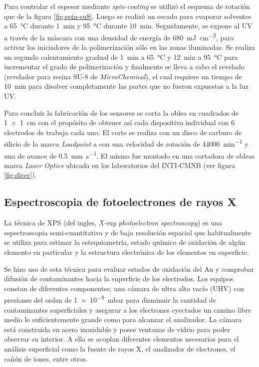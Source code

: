 		Para controlar el espesor mediante \textit{spin-coating} se utilizó el esquema de rotación que de la figura \ref{fig:spin-su8}. Luego se realizó un secado para evaporar solventes a \SI{65}{\celsius} durante \SI{1}{\minute} y \SI{95}{\celsius} durante \SI{10}{\minute}. Seguidamente, se expone al UV a través de la máscara con una densidad de energía de \SI{680}{mJ.cm^{-2}}, para activar los iniciadores de la polimerización sólo en las zonas iluminadas. Se realiza un segundo calentamiento gradual de \SI{1}{\minute} a \SI{65}{\celsius} y \SI{12}{\minute} a \SI{95}{\celsius} para incrementar el grado de polimerización y finalmente se lleva a cabo el revelado (revelador para resina SU-8 de \textit{MicroChemical}), el cual requiere un tiempo de \SI{10}{\minute} para disolver completamente las partes que no fueron expuestas a la luz UV. 
		
		Para concluir la fabricación de los sensores se corta la oblea en cuadrados de \SI{1x1}{\cm} con el propósito de obtener así cada dispositivo individual con 6 electrodos de trabajo cada uno. El corte se realiza con un disco de carburo de silicio de la marca \textit{Loadpoint} a con una velocidad de rotación de \SI{44000}{\minute^{-1}} y una de avance de \SI{0.5}{\mm\per\second}. El mismo fue montado en una cortadora de obleas marca \textit{Laser Optics} ubicada en los laboratorios del INTI-CMNB (ver figura \ref{fig:dicer}).
	
	\subsection{Espectroscopia de fotoelectrones de rayos X}

		La técnica de XPS (del ingles, \textit {X-ray photoelectron spectroscopy}) es una espectroscopia semi-cuantitativa y de baja resolución espacial que habitualmente se utiliza para estimar la estequiometría, estado químico de oxidación de algún elemento en particular y la estructura electrónica de los elementos en superficie.\cite{siegbahn1956,siegbahn1981}

		Se hizo uso de esta técnica para evaluar estados de oxidación del Au y comprobar difusión de contaminantes hacia la superficie de los electrodos.  Los equipos constan de diferentes componentes; una cámara de ultra alto vacío (UHV) con presiones del orden de \SI{1e-9}{mbar} para disminuir la cantidad de contaminantes superficiales y asegurar a los electrones eyectados un camino libre medio lo suficientemente grande como para alcanzar el analizador. La cámara está construida en acero inoxidable y posee ventanas de vidrio para poder observar su interior. A ella se acoplan diferentes elementos necesarios para el análisis superficial como la fuente de rayos X, el analizador de electrones, el cañón de iones, entre otros.\cite{XPS1978,Corthey2012}


